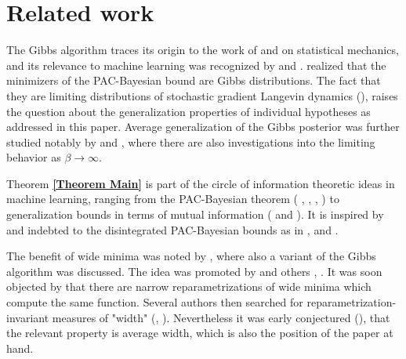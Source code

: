 \section{Related work\label{Section related work}
}

The Gibbs algorithm traces its origin to the work of \cite%
{boltzmann1877beziehung} and \cite{gibbs1902elementary} on statistical
mechanics, and its relevance to machine learning was recognized by \cite%
{levin1990statistical} and \cite{opper1991calculation}. \cite%
{mcallester1999pac} realized that the minimizers of the PAC-Bayesian bound
are Gibbs distributions. The fact that they are limiting distributions of
stochastic gradient Langevin dynamics (\cite{raginsky2017non}), raises the
question about the generalization properties of individual hypotheses as
addressed in this paper. Average generalization of the Gibbs posterior was
further studied notably by \cite{aminian2021exact} and \cite%
{aminian2023information}, where there are also investigations into the
limiting behavior as $\beta \rightarrow \infty $.

Theorem \textbf{\ref{Theorem Main}} is part of the circle of information
theoretic ideas in machine learning, ranging from the PAC-Bayesian theorem (%
\cite{shawe1997pac}, \cite{mcallester1999pac}, \cite{mcallester2003pac}, 
\cite{catoni2003pac}) to generalization bounds in terms of mutual
information (\cite{russo2016controlling} and \cite{xu2017information}). It
is inspired by and indebted to the disintegrated PAC-Bayesian bounds as in 
\cite{blanchard2007occam}, \cite{rivasplata2020pac} and \cite%
{viallard2024general}.

The benefit of wide minima was noted by \cite{hochreiter1997flat}, where
also a variant of the Gibbs algorithm was discussed. The idea was promoted
by \cite{keskar2016large} and others \cite{zhang2018theory}, \cite%
{iyer2023wide}. It was soon objected by \cite{dinh2017sharp} that there are
narrow reparametrizations of wide minima which compute the same function.
Several authors then searched for reparametrization-invariant measures of
"width" (\cite{andriushchenko2023modern}, \cite{kristiadi2024geometry}).
Nevertheless it was early conjectured (\cite{neyshabur2017exploring}), that
the relevant property is average width, which is also the position of the
paper at hand.